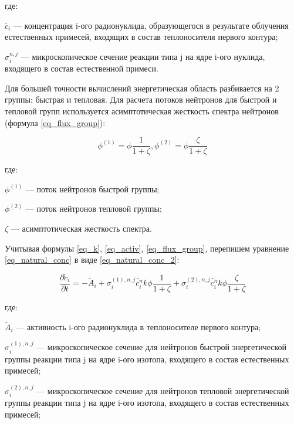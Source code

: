 где:
\begin{description}
    \item $\widetilde{c_{i}}$ --- концентрация i-ого радионуклида, образующегося в результате облучения естественных 
        примесей, входящих в состав теплоносителя первого контура;
    \item $\sigma_{i}^{n,j}$ --- микроскопическое сечение реакции типа j на ядре i-ого нуклида, входящего в состав 
        естественной примеси.
\end{description}

Для большей точности вычислений энергетическая область разбивается на 2 группы: быстрая и тепловая. Для расчета потоков 
нейтронов для быстрой и тепловой групп используется асимптотическая жесткость спектра нейтронов 
(формула \ref{eq_flux_group}):

\begin{equation}
    \label{eq_flux_group}
    \phi^{(1)} = \phi \frac{1}{1 + \zeta}, \phi^{(2)} = \phi \frac{\zeta}{1 + \zeta}
\end{equation}

где:
\begin{description}
    \item $\phi^{(1)}$ --- поток нейтронов быстрой группы;
    \item $\phi^{(2)}$ --- поток нейтронов тепловой группы;
    \item $\zeta$ --- асимптотическая жесткость спектра.
\end{description}

Учитывая формулы \ref{eq_k}, \ref{eq_activ}, \ref{eq_flux_group}, перепишем уравнение \ref{eq_natural_conc} в виде 
\ref{eq_natural_conc_2}:

\begin{equation}
    \label{eq_natural_conc_2}
    \frac{\partial \widetilde{c}_{i}}{\partial t} = -\widetilde{A}_{i} + \sigma_{i}^{(1), n,j} \widetilde{c_{i}^{n}}
        k \phi \frac{1}{1 + \zeta} + \sigma_{i}^{(2), n,j} \widetilde{c_{i}^{n}} k \phi \frac{\zeta}{1 + \zeta}
\end{equation}

где:
\begin{description}
    \item $\widetilde{A}_{i}$ --- активность i-ого радионуклида в теплоносителе первого контура;
    \item $\sigma_{i}^{(1), n,j}$ --- микроскопическое сечение для нейтронов быстрой энергетической группы реакции типа 
        j на ядре i-ого изотопа, входящего в состав естественных примесей;
    \item $\sigma_{i}^{(2), n,j}$ --- микроскопическое сечение для нейтронов тепловой энергетической группы реакции типа 
        j на ядре i-ого изотопа, входящего в состав естественных примесей; 
\end{description}

